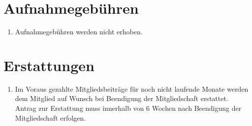 \documentclass[a4paper,12pt]{scrartcl}
\begin{document}
\section{Aufnahmegebühren}
\begin{enumerate}
  \item Aufnahmegebühren werden nicht erhoben.
\end{enumerate}

\section{Erstattungen}
\begin{enumerate}
  \item Im Voraus gezahlte Mitgliedsbeiträge für noch nicht laufende Monate
    werden dem Mitglied auf Wunsch bei Beendigung der Mitgliedschaft erstattet.
    Antrag zur Erstattung muss innerhalb von 6 Wochen nach Beendigung der
    Mitgliedschaft erfolgen.
\end{enumerate}
\end{document}
